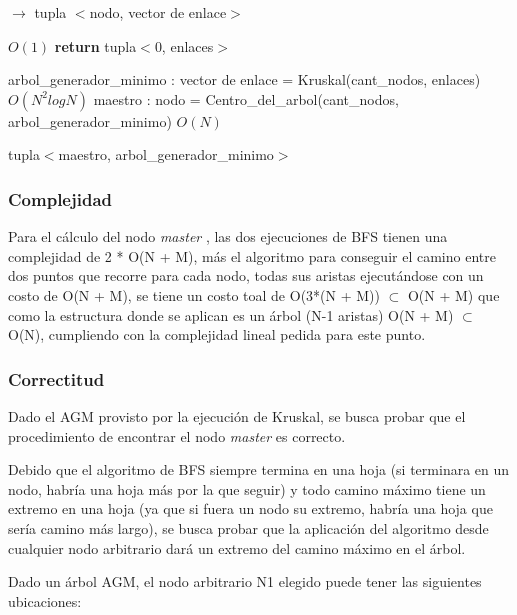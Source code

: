 \documentclass[a4paper, 10pt, twoside]{article}
\newenvironment{pseudo}[1][]{%
    \vspace{0.5em}%
    \begin{algorithmic}%
}
{%
    \end{algorithmic}%
    \vspace{0.5em}%
}
\newcommand{\Ode}[1]{\hfill $O(#1)$}
\begin{document}
\begin{pseudo}
 $\rightarrow$ tupla $<$nodo, vector de enlace$>$

                                 \Ode{1}
    \State \textbf{return} tupla$<$0, enlaces$>$
  \EndIf

  \State arbol\_generador\_minimo : vector de enlace = Kruskal(cant\_nodos, enlaces) \Ode{N^2 log N}
  \State maestro : nodo = Centro\_del\_arbol(cant\_nodos, arbol\_generador\_minimo) \Ode{N}

    \Return tupla$<$maestro, arbol\_generador\_minimo$>$
\EndProcedure
\end{pseudo}

\subsubsection{Complejidad}

Para el cálculo del nodo \textit{master} , las dos ejecuciones de BFS tienen una complejidad de 2 * O(N + M), más el algoritmo para conseguir el camino entre dos puntos que recorre para cada nodo, todas sus aristas ejecutándose con un costo de O(N + M), se tiene un costo toal de O(3*(N + M)) $\subset$ O(N + M) que como la estructura donde se aplican es un árbol (N-1 aristas) O(N + M) $\subset$ O(N), cumpliendo con la complejidad lineal pedida para este punto.

\subsubsection{Correctitud}

Dado el AGM provisto por la ejecución de Kruskal, se busca probar que el procedimiento de encontrar el nodo \textit{master} es correcto.

Debido que el algoritmo de BFS siempre termina en una hoja (si terminara en un nodo, habría una hoja más por la que seguir) y todo camino máximo tiene un extremo en una hoja (ya que si fuera un nodo su extremo, habría una hoja que sería camino más largo), se busca probar que la aplicación del algoritmo desde cualquier nodo arbitrario dará un extremo del camino máximo en el árbol.

Dado un árbol AGM, el nodo arbitrario N1 elegido puede tener las siguientes ubicaciones:
\end{document}
